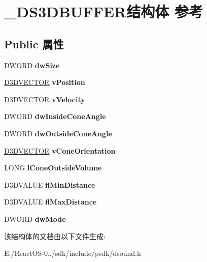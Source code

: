 \hypertarget{struct___d_s3_d_b_u_f_f_e_r}{}\section{\+\_\+\+D\+S3\+D\+B\+U\+F\+F\+E\+R结构体 参考}
\label{struct___d_s3_d_b_u_f_f_e_r}
\subsection*{Public 属性}
\begin{DoxyCompactItemize}
\item 
\mbox{\label{struct___d_s3_d_b_u_f_f_e_r_a4fa22e228075485d8134c5bda4d907d6}} 
D\+W\+O\+RD {\bfseries dw\+Size}
\item 
\mbox{\label{struct___d_s3_d_b_u_f_f_e_r_a6c301c977500deadd609cf5e373ab060}} 
\hyperlink{struct___d3_d_v_e_c_t_o_r}{D3\+D\+V\+E\+C\+T\+OR} {\bfseries v\+Position}
\item 
\mbox{\label{struct___d_s3_d_b_u_f_f_e_r_a94bfe04b47892036cd7494fb71192e57}} 
\hyperlink{struct___d3_d_v_e_c_t_o_r}{D3\+D\+V\+E\+C\+T\+OR} {\bfseries v\+Velocity}
\item 
\mbox{\label{struct___d_s3_d_b_u_f_f_e_r_a1f6c98d823d6b3579430474f6c0d50fb}} 
D\+W\+O\+RD {\bfseries dw\+Inside\+Cone\+Angle}
\item 
\mbox{\label{struct___d_s3_d_b_u_f_f_e_r_a3a616b07bc3b150b606c6f29a827d7ad}} 
D\+W\+O\+RD {\bfseries dw\+Outside\+Cone\+Angle}
\item 
\mbox{\label{struct___d_s3_d_b_u_f_f_e_r_a2d6ee0d1c20d2542dce48431bf488b99}} 
\hyperlink{struct___d3_d_v_e_c_t_o_r}{D3\+D\+V\+E\+C\+T\+OR} {\bfseries v\+Cone\+Orientation}
\item 
\mbox{\label{struct___d_s3_d_b_u_f_f_e_r_aa24bf79534683a937688b9926ed58eb1}} 
L\+O\+NG {\bfseries l\+Cone\+Outside\+Volume}
\item 
\mbox{\label{struct___d_s3_d_b_u_f_f_e_r_aafc2b68d75068a6e65189d65add41bda}} 
D3\+D\+V\+A\+L\+UE {\bfseries fl\+Min\+Distance}
\item 
\mbox{\label{struct___d_s3_d_b_u_f_f_e_r_afe4286b8737f2c43f292b9900fc29845}} 
D3\+D\+V\+A\+L\+UE {\bfseries fl\+Max\+Distance}
\item 
\mbox{\label{struct___d_s3_d_b_u_f_f_e_r_a4202d9058d1e3bf5f9a0723f6946bcb4}} 
D\+W\+O\+RD {\bfseries dw\+Mode}
\end{DoxyCompactItemize}


该结构体的文档由以下文件生成\+:\begin{DoxyCompactItemize}
\item 
E\+:/\+React\+O\+S-\/0../sdk/include/psdk/dsound.\+h\end{DoxyCompactItemize}
